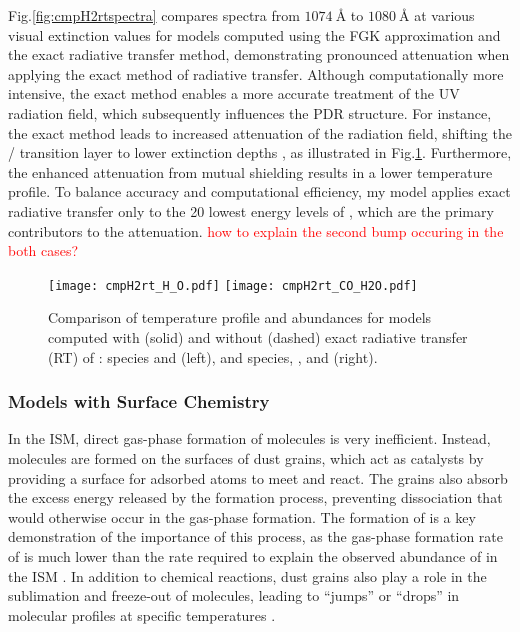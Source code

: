 \documentclass[12pt,a4paper]{article}
\newcommand{\qt}[1]{\textcolor{red}{#1}}
\begin{document}
Fig.\ref{fig:cmpH2rtspectra} compares spectra from $1074~\text{\AA}$ to $1080~\text{\AA}$ at various visual extinction values for models computed using the FGK approximation and the exact radiative transfer method, demonstrating pronounced attenuation when applying the exact method of  radiative transfer. Although computationally more intensive, the exact method enables a more accurate treatment of the UV radiation field, which subsequently influences the PDR structure. For instance, the exact method leads to increased attenuation of the radiation field, shifting the / transition layer to lower extinction depths \parencite{Goicoechea2007}, as illustrated in Fig.\ref{fig:cmpH2rt}. Furthermore, the enhanced attenuation from mutual shielding results in a lower temperature profile. To balance accuracy and computational efficiency, my model applies exact radiative transfer only to the 20 lowest energy levels of , which are the primary contributors to the attenuation. \qt{how to explain the second bump occuring in the both cases?}

\begin{figure}[ht]
    \centering
    \texttt{[image: cmpH2rt\_H\_O.pdf]}
    \texttt{[image: cmpH2rt\_CO\_H2O.pdf]}
    \caption{Comparison of temperature profile and abundances for models computed with (solid) and without (dashed) exact radiative transfer (RT) of :  species and  (left), and  species, , and  (right). } \label{fig:cmpH2rt}
\end{figure}

\subsubsection{Models with Surface Chemistry}
In the ISM, direct gas-phase formation of molecules is very inefficient. Instead, molecules are formed on the surfaces of dust grains, which act as catalysts by providing a surface for adsorbed atoms to meet and react. The grains also absorb the excess energy released by the formation process, preventing dissociation that would otherwise occur in the gas-phase formation. The formation of  is a key demonstration of the importance of this process, as the gas-phase formation rate of  is much lower than the rate required to explain the observed abundance of  in the ISM \parencite{Gould1963,Hollenbach1971}. In addition to chemical reactions, dust grains also play a role in the sublimation and freeze-out of molecules, leading to “jumps” or “drops” in molecular profiles at specific temperatures \parencite{Herbst2009}.
\end{document}
